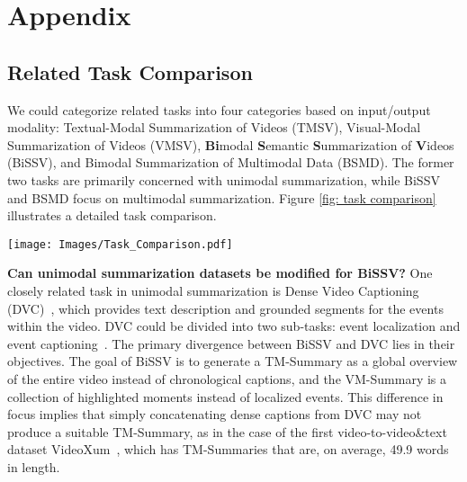 \clearpage

\section{Appendix}

\subsection{Related Task Comparison}
\label{sec: related task comparison}

We could categorize related tasks into four categories based on input/output modality: Textual-Modal Summarization of Videos (TMSV), Visual-Modal Summarization of Videos (VMSV), \textbf{Bi}modal \textbf{S}emantic \textbf{S}ummarization of \textbf{V}ideos (BiSSV), and Bimodal Summarization of Multimodal Data (BSMD). The former two tasks are primarily concerned with unimodal summarization, while BiSSV and BSMD focus on multimodal summarization. Figure \ref{fig: task comparison} illustrates a detailed task comparison.

\begin{figure*}[b]
    \centering
    \texttt{[image: Images/Task\_Comparison.pdf]}
    \vspace{-8pt}
    \caption{Comparison between BiSSV and related tasks. DVC: Dense Video Captioning. BSMD: Bimodal Summarization of Multimodal Data. BiSSV: Bimodal Semantic Summarization of Videos.}
    \label{fig: task comparison}
\end{figure*}

\textbf{Can unimodal summarization datasets be modified for BiSSV?} One closely related task in unimodal summarization is Dense Video Captioning (DVC)~\cite{krishna2017dense}, which provides text description and grounded segments for the events within the video. DVC could be divided into two sub-tasks: event localization and event captioning~\cite{wang2021end,zhang2022unifying}. The primary divergence between BiSSV and DVC lies in their objectives. The goal of BiSSV is to generate a TM-Summary as a global overview of the entire video instead of chronological captions, and the VM-Summary is a collection of highlighted moments instead of localized events. This difference in focus implies that simply concatenating dense captions from DVC may not produce a suitable TM-Summary, as in the case of the first video-to-video\&text dataset VideoXum~\cite{lin2023videoxum}, which has TM-Summaries that are, on average, 49.9 words in length.

